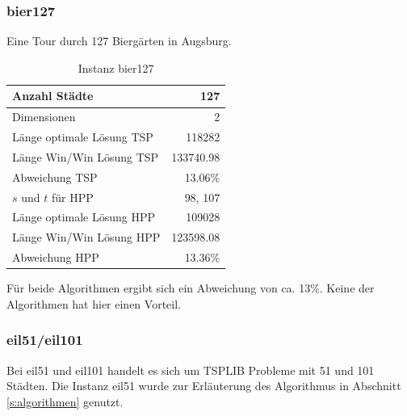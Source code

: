 \documentclass[11pt,a4paper]{article}
\begin{document}
\newpage

\subsubsection{bier127}
Eine Tour durch 127 Biergärten in Augsburg.

        \begin{table}[H]
                \centering
                \begin{tabular}{| l | r |}
                    \hline
                        Anzahl Städte               & 127           \\ \hline
                        Dimensionen                 & 2             \\ \hline
                        Länge optimale Lösung TSP   & 118282        \\ \hline
                        Länge Win/Win Lösung  TSP   & 133740.98     \\ \hline
                        Abweichung TSP              & 13.06\%       \\ \hline
                        $s$ und $t$ für HPP         & 98, 107       \\ \hline
                        Länge optimale Lösung HPP   & 109028        \\ \hline
                        Länge Win/Win Lösung  HPP   & 123598.08     \\ \hline
                        Abweichung HPP              & 13.36\%       \\ \hline
                \end{tabular}
                \caption{Instanz bier127}
                \label{tab:bier127}
        \end{table}

Für beide Algorithmen ergibt sich ein Abweichung von ca. 13\%. Keine der Algorithmen hat hier einen Vorteil.

\subsubsection{eil51/eil101}
Bei eil51 und eil101 handelt es sich um TSPLIB Probleme mit 51 und 101 Städten. Die Instanz eil51 wurde zur Erläuterung des Algorithmus in Abschnitt \ref{s:algorithmen} genutzt.
\end{document}
